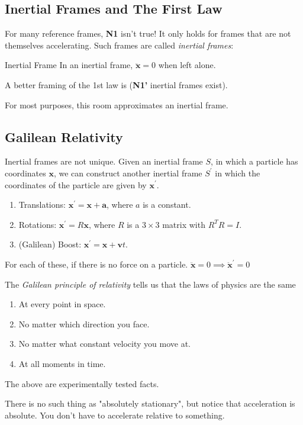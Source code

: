 \subsection{Inertial Frames and The First Law}
For many reference frames, \textbf{N1} isn't true! It only holds for frames that are not themselves accelerating. Such frames are called \textit{inertial frames}:
\begin{definition}{Inertial Frame}{}
    In an inertial frame, $\ddot{\mathbf{x} }=0$ when left alone.
\end{definition}

A better framing of the 1st law is (\textbf{N1'} inertial frames exist).

For most purposes, this room approximates an inertial frame.

\subsection{Galilean Relativity}
Inertial frames are not unique. Given an inertial frame $S$, in which a particle has coordinates $\mathbf{x} $, we can construct another inertial frame $S^\prime $ in which the coordinates of the particle are given by $\mathbf{x} ^\prime $.
\begin{enumerate}
    \item Translations: $\mathbf{x} ^\prime =\mathbf{x}  + \mathbf{a} $, where $a$ is a constant.
    \item Rotations: $\mathbf{x} ^\prime = R\mathbf{x} $, where $R$ is a $3\times 3$ matrix with $R^{T}R=I$.
    \item (Galilean) Boost: $\mathbf{x}^\prime =\mathbf{x}  + \mathbf{v} t$.
\end{enumerate}

For each of these, if there is no force on a particle.
\(\ddot{\mathbf{x}} = 0 \implies \ddot{\textbf{x}}^\prime =0 \) 

The \textit{Galilean principle of relativity} tells us that the laws of physics are the same
\begin{enumerate}
    \item At every point in space.
    \item No matter which direction you face.
    \item No matter what constant velocity you move at.
    \item At all moments in time.
\end{enumerate}
The above are experimentally tested facts.

There is no such thing as "absolutely stationary", but notice that acceleration is absolute. You don't have to accelerate relative to something.